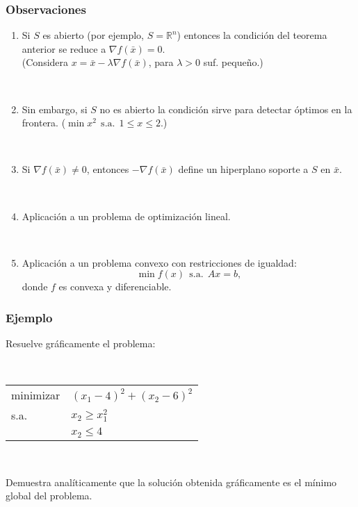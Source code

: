 \documentclass{beamer}
\begin{document}
\begin{frame}
\frametitle{Observaciones}

\begin{enumerate}







\item Si $S$ es abierto (por ejemplo, $S=\mathbb{R}^n$) entonces la condición del teorema anterior se reduce a $\nabla f(\bar{x}) =0$. \\
(Considera $x=\bar{x}-\lambda \nabla f(\bar{x})$, para $\lambda>0$ suf. pequeño.)

\

\item Sin embargo, si $S$ no es abierto la condición sirve para detectar óptimos en la frontera. 
($\min x^2\ \ \mbox{s.a.}\ \ 1\leq x \leq 2$.)

\

\item Si $\nabla f(\bar{x}) \neq 0$, entonces $-\nabla f(\bar{x})$ define un hiperplano soporte a $S$ en $\bar{x}$.

\

\item Aplicación a un problema de optimización lineal.

\

\item Aplicación a un problema convexo con restricciones de igualdad:
\[
\min f(x)\ \ \mbox{s.a.}\ \ Ax=b,
\]
donde $f$ es convexa y diferenciable.
\end{enumerate}



\end{frame}
\begin{frame}
\frametitle{Ejemplo}




Resuelve gráficamente el problema:

\

\begin{center}
\begin{tabular}{ll}
minimizar & $(x_1-4)^2 + (x_2-6)^2$  \\
s.a. & $x_2\geq x_1^2$  \\
	 & $x_2\leq 4$  
\end{tabular}
\end{center}

\

Demuestra analíticamente que la solución obtenida gráficamente es el mínimo global del problema.




\end{frame}
\end{document}
